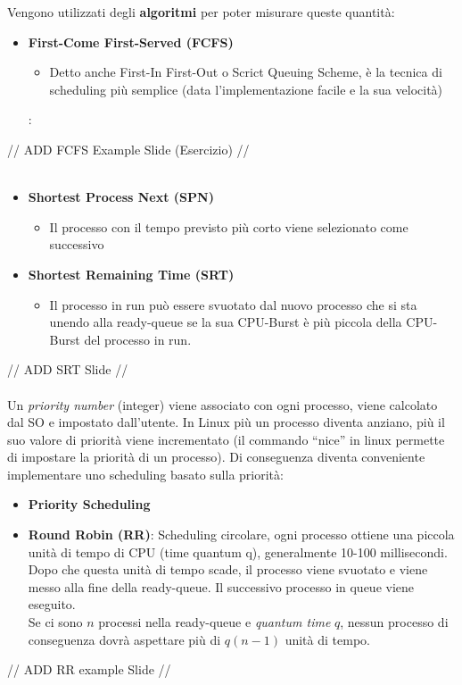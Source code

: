 \documentclass[12pt, a4paper]{article}
\begin{document}
	Vengono utilizzati degli \textbf{algoritmi} per poter misurare queste quantità:
	\begin{itemize}
		\item \textbf{First-Come First-Served (FCFS)}
		\begin{itemize}
			\item Detto anche First-In First-Out o Scrict Queuing Scheme, è la tecnica di scheduling più semplice (data l'implementazione facile e la sua velocità)
		\end{itemize}
:	\end{itemize}
	// ADD FCFS Example Slide (Esercizio) // \\ \\
	\begin{itemize}
		\item \textbf{Shortest Process Next (SPN)}
			\begin{itemize}
				\item Il processo con il tempo previsto più corto viene selezionato come successivo
			\end{itemize}
		\item \textbf{Shortest Remaining Time (SRT)}
			\begin{itemize}
				\item Il processo in run può essere svuotato dal nuovo processo che si sta unendo alla ready-queue se la sua CPU-Burst è più piccola della CPU-Burst del processo in run.
			\end{itemize}
	\end{itemize}
	// ADD SRT Slide // \\ \\
	Un \textit{priority number} (integer) viene associato con ogni processo, viene calcolato dal SO e impostato dall'utente. In Linux più un processo diventa anziano, più il suo valore di priorità viene incrementato (il commando ``nice'' in linux permette di impostare la priorità di un processo). Di conseguenza diventa conveniente implementare uno scheduling basato sulla priorità:
	\begin{itemize}
		\item \textbf{Priority Scheduling}
		\item \textbf{Round Robin (RR)}: Scheduling circolare, ogni processo ottiene una piccola unità di tempo di CPU (time quantum q), generalmente 10-100 millisecondi. Dopo che questa unità di tempo scade, il processo viene svuotato e viene messo alla fine della ready-queue. Il successivo processo in queue viene eseguito. \\
		Se ci sono $n$ processi nella ready-queue e \textit{quantum time} $q$, nessun processo di conseguenza dovrà aspettare più di $q(n-1)$ unità di tempo.
	\end{itemize}
	// ADD RR example Slide // \\ \\
	
\end{document}
